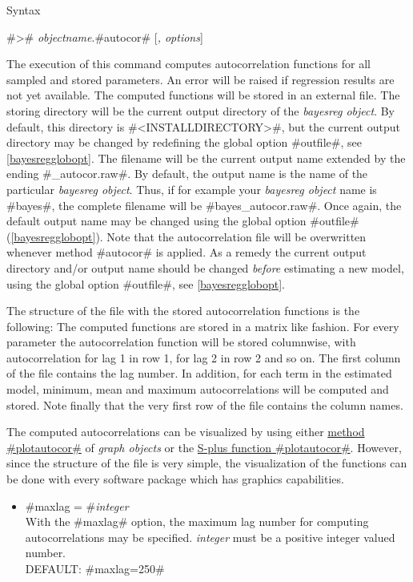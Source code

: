 \begin{stanza}{Syntax}

#># {\em objectname}.#autocor# [{\em , options}]

The execution of this command computes autocorrelation functions
for all sampled and stored parameters. An error
 will be raised
if regression results are not yet available. The computed
functions will be stored in an external file. The storing
directory will be the current output directory of the {\em
bayesreg object}. By default, this directory is
#<INSTALLDIRECTORY>\output#, but the current output
directory may be changed by redefining the global option
#outfile#, see \autoref{bayesregglobopt}. The filename will be
the current output name extended by the ending #_autocor.raw#. By
default, the output name is the name of the particular {\em
bayesreg object}. Thus, if for example your {\em bayesreg object}
 name is #bayes#, the complete
filename will be #bayes_autocor.raw#. Once again, the  default
output name may be changed using the global option #outfile#
(\autoref{bayesregglobopt}). Note that the autocorrelation file
will be overwritten whenever method #autocor# is applied. As a
remedy the current output directory and/or output name should be
changed {\em before} estimating a new model, using the global
option #outfile#, see \autoref{bayesregglobopt}.

The structure of the file with the stored autocorrelation
functions is the following: The computed functions are stored in a
matrix like fashion. For every parameter the autocorrelation
function will be stored columnwise, with autocorrelation for lag 1
in row 1, for lag 2 in row 2 and so on. The first column of the
file contains the lag number. In addition, for each term in the
estimated model, minimum, mean and maximum autocorrelations will
be computed and stored. Note finally that the very first row of
the file contains the column names.

The computed autocorrelations can be visualized by using either
\hyperref[graphplotautocor]{method #plotautocor#} of {\em graph
objects} or the \hyperref[splusplotautocor]{S-plus function
#plotautocor#}. However, since the structure of the file is very
simple, the visualization of the functions can be done with every
software package which has graphics capabilities.
\end{stanza}


\begin{itemize}
\item  #maxlag = #{\em integer } \\
With the #maxlag# option, the maximum lag number for computing
autocorrelations may be specified.
{\em integer} must be a positive integer valued number. \\
DEFAULT: #maxlag=250#
\end{itemize}

